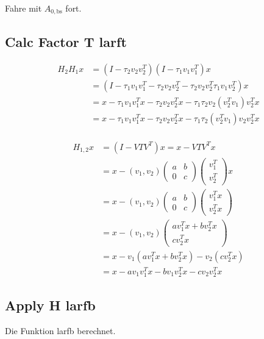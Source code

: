 Fahre mit $A_{0, \text{bs}}$ fort.

\subsection{Calc Factor T larft}
\cite{Joffrain:2006:AHT:1141885.1141886}

\begin{align*}
	H_2 H_1 x &= (I-\tau_2 v_2 v_2^T)(I-\tau_1 v_1 v_1^T)x\\
	&= (I - \tau_1 v_1 v_1^T - \tau_2 v_2 v_2^T - \tau_2 v_2 v_2^T \tau_1 v_1 v_2^T) x\\
  &= x - \tau_1 v_1 v_1^T x - \tau_2 v_2 v_2^T x - \tau_1 \tau_2 v_2 (v_2^T v_1 )v_2^T x\\
  &= x - \tau_1 v_1 v_1^T x - \tau_2 v_2 v_2^T x - \tau_1 \tau_2 (v_2^T v_1 ) v_2 v_2^T x\\
\end{align*}

\begin{align*}
  H_{1,2} x &= (I - V T V^T) x = x - V T V^T x\\
  &= x - (v_1, v_2)
  \begin{pmatrix}
    a & b \\ 0 & c
  \end{pmatrix}
  \begin{pmatrix}
    v_1^T \\ v_2^T 
  \end{pmatrix}
  x\\
  &= x - (v_1, v_2)
  \begin{pmatrix}
    a & b \\ 0 & c
  \end{pmatrix}
  \begin{pmatrix}
    v_1^T x \\ v_2^T x
  \end{pmatrix}\\
  &= x - (v_1, v_2)
  \begin{pmatrix}
    a v_1^T x + b v_2^T x\\  c v_2^T x
  \end{pmatrix}\\
  &= x - v_1(a v_1^T x + b v_2^T x) - v_2 (c v_2^T x)\\
  &= x - a v_1 v_1^T x - b v_1 v_2^T x - c v_2 v_2^T x
\end{align*}

\subsection{Apply H larfb}
Die Funktion larfb berechnet.

